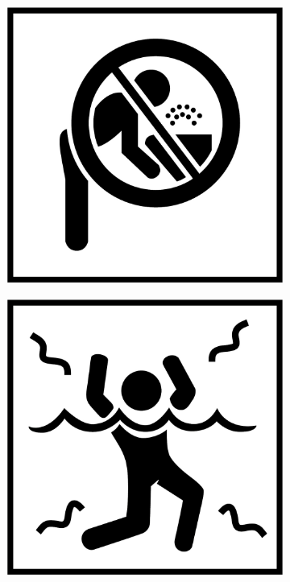 \begin{figure}[H]
\begin{subfigure}[l]{0.195\linewidth}
  \end{subfigure}
  \begin{subfigure}[l]{0.195\linewidth}
    \includegraphics[width=\textwidth]{Sources/PortalIcons/8.jpg}
  \end{subfigure}
  \begin{subfigure}[l]{0.195\linewidth}
    \includegraphics[width=\textwidth]{Sources/PortalIcons/9.jpg}

\end{subfigure}
\end{figure}
